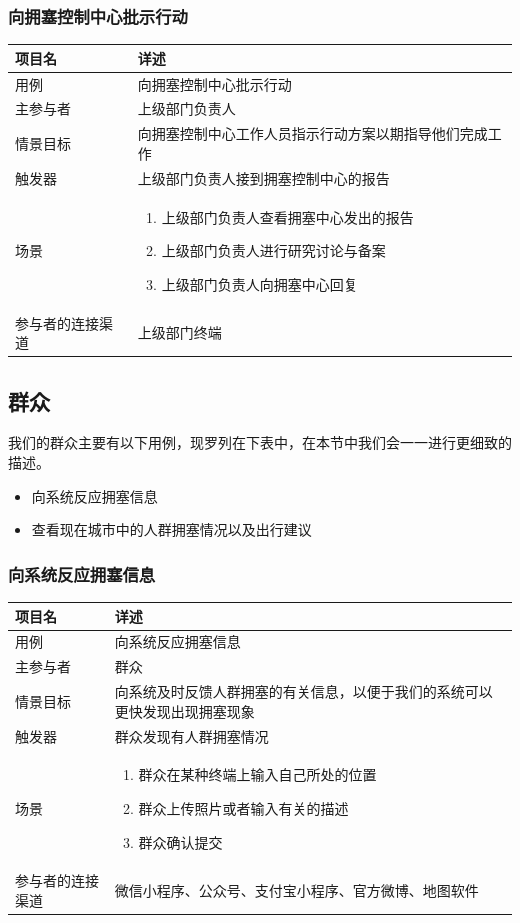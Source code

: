 \documentclass{ctexrep}
\begin{document}
\subsubsection{向拥塞控制中心批示行动}
\begin{longtable}{p{2cm} | p{10cm}}
\hline
项目名 & 详述 \\
\hline
\hline
用例 & 向拥塞控制中心批示行动 \\
\hline
主参与者 & 上级部门负责人 \\
\hline
情景目标 & 向拥塞控制中心工作人员指示行动方案以期指导他们完成工作  \\
\hline
触发器 & 上级部门负责人接到拥塞控制中心的报告 \\
\hline
场景 & \begin{enumerate}
	\item 上级部门负责人查看拥塞中心发出的报告
	\item 上级部门负责人进行研究讨论与备案
	\item 上级部门负责人向拥塞中心回复
\end{enumerate} \\
\hline
参与者的连接渠道 & 上级部门终端 \\
\hline
\end{longtable}

\subsection{群众}
我们的群众主要有以下用例，现罗列在下表中，在本节中我们会一一进行更细致的描述。
\begin{itemize}
\item 向系统反应拥塞信息
\item 查看现在城市中的人群拥塞情况以及出行建议
\end{itemize}
\subsubsection{向系统反应拥塞信息}
\begin{longtable}{p{2cm} | p{10cm}}
\hline
项目名 & 详述 \\
\hline
\hline
用例 & 向系统反应拥塞信息\\
\hline
主参与者 & 群众\\
\hline
情景目标 &  向系统及时反馈人群拥塞的有关信息，以便于我们的系统可以更快发现出现拥塞现象\\
\hline
触发器 & 群众发现有人群拥塞情况\\
\hline
场景 & \begin{enumerate}
	\item 群众在某种终端上输入自己所处的位置
	\item 群众上传照片或者输入有关的描述
	\item 群众确认提交
\end{enumerate} \\
\hline
参与者的连接渠道 & 微信小程序、公众号、支付宝小程序、官方微博、地图软件\\
\hline
\end{longtable}
\end{document}
